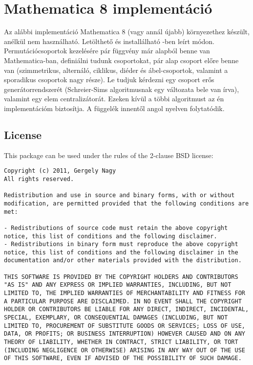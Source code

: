 \section{Mathematica 8 implementáció}
Az alábbi implementáció Mathematica 8 (vagy annál újabb) környezethez készült, anélkül nem használható.
Letölthető és installálható \cite{Nag12}-ben leírt módon.
Permutációcsoportok kezelésére pár függvény már alapból benne van Mathematica-ban,
definiálni tudunk csoportokat, pár alap csoport előre benne van
(szimmetrikus, alternáló, ciklikus, diéder és ábel-csoportok, valamint a sporadikus csoportok nagy része).
Le tudjuk kérdezni egy csoport erős generátorrendszerét (Schreier-Sims algoritmusnak egy változata bele van írva),
valamint egy elem centralizátorát.
Ezeken kívül a többi algoritmust az én implementációm biztosítja.
A függelék innentől angol nyelven folytatódik.
\clearpage

\subsection{License}
This package can be used under the rules of the 2-clause BSD license:
\lstset{
	breaklines=true,
	showstringspaces=false,
}
\begin{lstlisting}
Copyright (c) 2011, Gergely Nagy
All rights reserved.

Redistribution and use in source and binary forms, with or without modification, are permitted provided that the following conditions are met:

- Redistributions of source code must retain the above copyright notice, this list of conditions and the following disclaimer.
- Redistributions in binary form must reproduce the above copyright notice, this list of conditions and the following disclaimer in the documentation and/or other materials provided with the distribution.

THIS SOFTWARE IS PROVIDED BY THE COPYRIGHT HOLDERS AND CONTRIBUTORS "AS IS" AND ANY EXPRESS OR IMPLIED WARRANTIES, INCLUDING, BUT NOT LIMITED TO, THE IMPLIED WARRANTIES OF MERCHANTABILITY AND FITNESS FOR A PARTICULAR PURPOSE ARE DISCLAIMED. IN NO EVENT SHALL THE COPYRIGHT HOLDER OR CONTRIBUTORS BE LIABLE FOR ANY DIRECT, INDIRECT, INCIDENTAL, SPECIAL, EXEMPLARY, OR CONSEQUENTIAL DAMAGES (INCLUDING, BUT NOT LIMITED TO, PROCUREMENT OF SUBSTITUTE GOODS OR SERVICES; LOSS OF USE, DATA, OR PROFITS; OR BUSINESS INTERRUPTION) HOWEVER CAUSED AND ON ANY THEORY OF LIABILITY, WHETHER IN CONTRACT, STRICT LIABILITY, OR TORT (INCLUDING NEGLIGENCE OR OTHERWISE) ARISING IN ANY WAY OUT OF THE USE OF THIS SOFTWARE, EVEN IF ADVISED OF THE POSSIBILITY OF SUCH DAMAGE.
\end{lstlisting}
\clearpage


